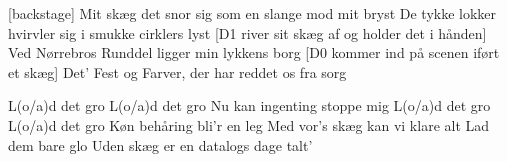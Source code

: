 \documentclass[a4paper,11pt]{article}
\begin{document}
\begin{song}
[backstage] 
Mit skæg det snor sig som en slange mod mit bryst
De tykke lokker hvirvler sig i smukke cirklers lyst
[D1 river sit skæg af og holder det i hånden]
Ved Nørrebros Runddel ligger min lykkens borg
[D0 kommer ind på scenen iført et skæg] 
Det' Fest og Farver, der har reddet os fra sorg

 L(o/a)d det gro
L(o/a)d det gro
 Nu kan ingenting stoppe mig
 L(o/a)d det gro
L(o/a)d det gro
 Køn behåring bli'r en leg
 Med vor's skæg kan vi klare alt
Lad dem bare glo
Uden skæg er en datalogs dage talt'

%
\end{song}
\end{document}
